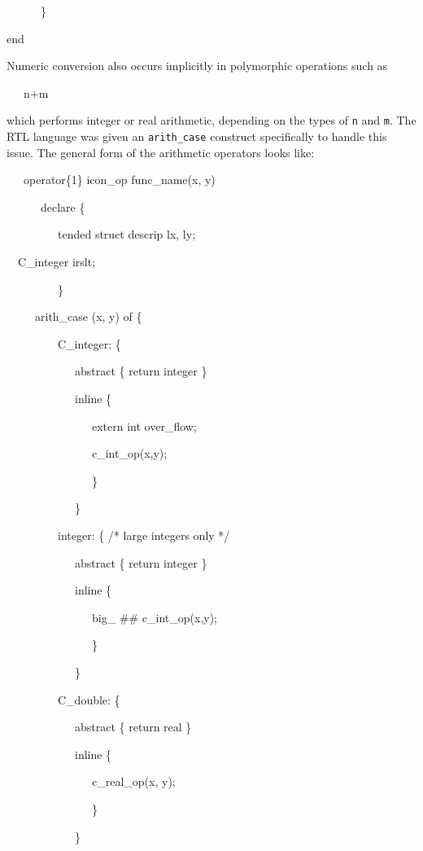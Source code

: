 {\ttfamily\mdseries
\ \ \ \ \ \ \}}

{\ttfamily\mdseries
end}


Numeric conversion also occurs implicitly in polymorphic operations such as

{\ttfamily\mdseries
\ \ \ n+m}

\noindent which performs integer or real arithmetic, depending on the
types of \texttt{n} and \texttt{m}. The RTL language was given an
\texttt{arith\_case} construct specifically to handle this issue. The
general form of the arithmetic operators looks like:


\ \ \ operator\{1\} icon\_op func\_name(x, y)

\ \ \ \ \ \ declare \{

\ \ \ \ \ \ \ \ \ tended struct descrip lx, ly;

\ \  C\_integer irslt;

\ \ \ \ \ \ \ \ \ \}

\ \ \ \ \ arith\_case (x, y) of \{

\ \ \ \ \ \ \ \ \ C\_integer: \{

\ \ \ \ \ \ \ \ \ \ \ \ abstract \{ return integer \}

\ \ \ \ \ \ \ \ \ \ \ \ inline \{

\ \ \ \ \ \ \ \ \ \ \ \ \ \ \ extern int over\_flow;

\ \ \ \ \ \ \ \ \ \ \ \ \ \ \ c\_int\_op(x,y);

\ \ \ \ \ \ \ \ \ \ \ \ \ \ \ \}

\ \ \ \ \ \ \ \ \ \ \ \ \}

\ \ \ \ \ \ \ \ \ integer: \{ /* large integers only */

\ \ \ \ \ \ \ \ \ \ \ \ abstract \{ return integer \}

\ \ \ \ \ \ \ \ \ \ \ \ inline \{

\ \ \ \ \ \ \ \ \ \ \ \ \ \ \ big\_ \#\# c\_int\_op(x,y);

\ \ \ \ \ \ \ \ \ \ \ \ \ \ \ \}

\ \ \ \ \ \ \ \ \ \ \ \ \}

\ \ \ \ \ \ \ \ \ C\_double: \{

\ \ \ \ \ \ \ \ \ \ \ \ abstract \{ return real \}

\ \ \ \ \ \ \ \ \ \ \ \ inline \{

\ \ \ \ \ \ \ \ \ \ \ \ \ \ \ c\_real\_op(x, y);

\ \ \ \ \ \ \ \ \ \ \ \ \ \ \ \}

\ \ \ \ \ \ \ \ \ \ \ \ \}

